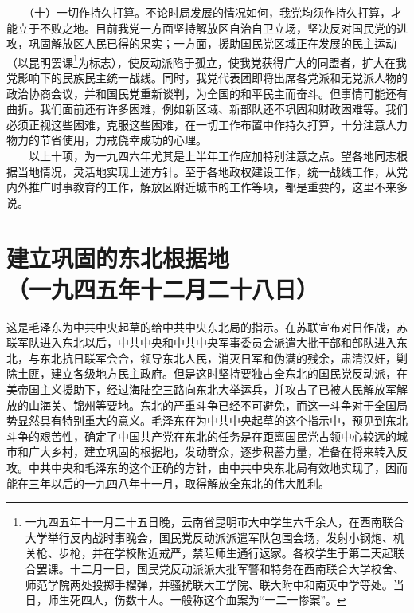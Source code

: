 \documentclass[cn,11pt,chinese]{elegantbook}
\def\myformat#1{\hfil\hfil #1}
\begin{document}
　　（十）一切作持久打算。不论时局发展的情况如何，我党均须作持久打算，才能立于不败之地。目前我党一方面坚持解放区自治自卫立场，坚决反对国民党的进攻，巩固解放区人民已得的果实；一方面，援助国民党区域正在发展的民主运动（以昆明罢课\footnote[6]{ 一九四五年十一月二十五日晚，云南省昆明市大中学生六千余人，在西南联合大学举行反内战时事晚会，国民党反动派派遣军队包围会场，发射小钢炮、机关枪、步枪，并在学校附近戒严，禁阻师生通行返家。各校学生于第二天起联合罢课。十二月一日，国民党反动派派大批军警和特务在西南联合大学校舍、师范学院两处投掷手榴弹，并骚扰联大工学院、联大附中和南英中学等处。当日，师生死四人，伤数十人。一般称这个血案为“一二一惨案”。}为标志），使反动派陷于孤立，使我党获得广大的同盟者，扩大在我党影响下的民族民主统一战线。同时，我党代表团即将出席各党派和无党派人物的政治协商会议，并和国民党重新谈判，为全国的和平民主而奋斗。但事情可能还有曲折。我们面前还有许多困难，例如新区域、新部队还不巩固和财政困难等。我们必须正视这些困难，克服这些困难，在一切工作布置中作持久打算，十分注意人力物力的节省使用，力戒侥幸成功的心理。\\
　　以上十项，为一九四六年尤其是上半年工作应加特别注意之点。望各地同志根据当地情况，灵活地实现上述方针。至于各地政权建设工作，统一战线工作，从党内外推广时事教育的工作，解放区附近城市的工作等项，都是重要的，这里不来多说。\\
\newpage\section*{\myformat{建立巩固的东北根据地}\\\myformat{（一九四五年十二月二十八日）}}
\begin{introduction}\item  这是毛泽东为中共中央起草的给中共中央东北局的指示。在苏联宣布对日作战，苏联军队进入东北以后，中共中央和中共中央军事委员会派遣大批干部和部队进入东北，与东北抗日联军会合，领导东北人民，消灭日军和伪满的残余，肃清汉奸，剿除土匪，建立各级地方民主政府。但是这时坚持要独占全东北的国民党反动派，在美帝国主义援助下，经过海陆空三路向东北大举运兵，并攻占了已被人民解放军解放的山海关、锦州等要地。东北的严重斗争已经不可避免，而这一斗争对于全国局势显然具有特别重大的意义。毛泽东在为中共中央起草的这个指示中，预见到东北斗争的艰苦性，确定了中国共产党在东北的任务是在距离国民党占领中心较远的城市和广大乡村，建立巩固的根据地，发动群众，逐步积蓄力量，准备在将来转入反攻。中共中央和毛泽东的这个正确的方针，由中共中央东北局有效地实现了，因而能在三年以后的一九四八年十一月，取得解放全东北的伟大胜利。\end{introduction}
\end{document}

